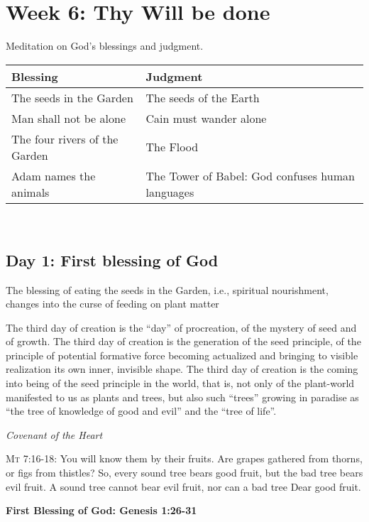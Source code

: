 \section{Week 6: Thy Will be done}

Meditation on God's blessings and judgment.

\begin{tabular}{ll}\toprule
\textbf{Blessing} &
\textbf{Judgment}\\\midrule
The seeds in the Garden &
The seeds of the Earth\\
Man shall not be alone &
Cain must wander alone\\
The four rivers of the Garden &
The Flood\\
Adam names the animals &
The Tower of Babel: God confuses human languages\\\bottomrule
\end{tabular}
 

\subsection*{Day 1: First blessing of God}
The blessing of eating the seeds in the Garden, i.e., spiritual nourishment, changes into the curse of feeding on plant
matter

\begin{quotationx}
The third day of creation is the “day” of procreation, of the mystery of seed and of growth. The third day of creation
is the generation of the seed principle, of the principle of potential formative force becoming actualized and bringing
to visible realization its own inner, invisible shape. The third day of creation is the coming into being of the seed
principle in the world, that is, not only of the plant-world manifested to us as plants and trees, but also such
“trees” growing in paradise as “the tree of knowledge of good and evil” and the “tree of life”. \begin{flushright} \emph{Covenant of
the Heart}\end{flushright}

\end{quotationx}

\textsc{Mt 7:16-18:} You will know them by their fruits. Are grapes gathered from thorns, or figs from thistles? So, every sound tree bears
good fruit, but the bad tree bears evil fruit. A sound tree cannot bear evil fruit, nor can a bad tree Dear good fruit.

\textbf{First Blessing of God: Genesis 1:26-31}

